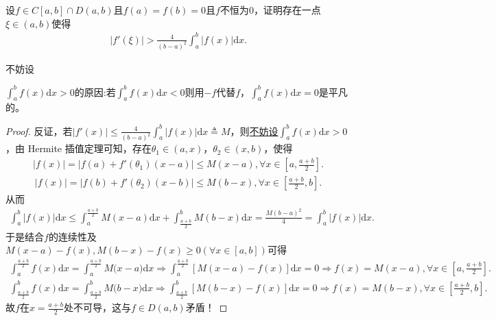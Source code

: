 \documentclass[../../main.tex]{subfiles}%
\begin{document}
\begin{example}
设\(f \in C[a,b]\cap D(a,b)\)且\(f(a) = f(b) = 0\)且\(f\)不恒为\(0\)，证明存在一点\(\xi \in (a,b)\)使得
\begin{align}
|f'(\xi)| > \frac{4}{(b - a)^2}\int_{a}^{b}\left|f(x)\right|\mathrm{d}x.\label{eq:::23523523424jrioj53313}
\end{align} 
\end{example}
\begin{remark}
\hypertarget{example0.5----:不妨设的原因}{不妨设}\(\int_{a}^{b}f(x)\mathrm{d}x > 0\)的原因:若\(\int_{a}^{b}f(x)\mathrm{d}x < 0\)则用\(-f\)代替\(f\)，\(\int_{a}^{b}f(x)\mathrm{d}x = 0\)是平凡的。
\end{remark}
\begin{proof}
反证，若\(|f'(x)| \leqslant \frac{4}{(b - a)^2}\int_{a}^{b}\left|f(x)\right| \mathrm{d}x\triangleq M\)，则\hyperlink{example0.5----:不妨设的原因}{不妨设\(\int_{a}^{b}f(x)\mathrm{d}x > 0\)}，由 Hermite 插值定理可知，存在\(\theta_1 \in (a, x)\)，\(\theta_2 \in (x, b)\)，使得
\begin{align*}
\left|f(x)\right| = \left|f(a) + f'(\theta_1)(x - a) \right|\leqslant M(x - a), \forall x \in \left[a, \frac{a + b}{2}\right].
\end{align*}
\begin{align*}
\left|f(x)\right| = \left|f(b) + f'(\theta_2)(x - b)\right| \leqslant M(b - x), \forall x \in \left[\frac{a + b}{2}, b\right].
\end{align*}
从而
\begin{align*}
\int_{a}^{b}|f(x)|\mathrm{d}x \leqslant \int_{a}^{\frac{a + b}{2}}M(x - a)\mathrm{d}x + \int_{\frac{a + b}{2}}^{b}M(b - x)\mathrm{d}x = \frac{M(b - a)^2}{4} = \int_{a}^{b}|f(x)|\mathrm{d}x.
\end{align*}
于是结合\(f\)的连续性及$M(x-a)-f(x),M(b-x)-f(x)\geqslant 0(\forall x\in [a,b])$可得
\begin{align*}
\int_a^{\frac{a+b}{2}}{f(x)\mathrm{d}x}=\int_a^{\frac{a+b}{2}}{M(x}-a)\mathrm{d}x\Longrightarrow \int_a^{\frac{a+b}{2}}{\left[ M\left( x-a \right) -f\left( x \right) \right] \mathrm{d}x}=0\Longrightarrow f(x)=M(x-a),\forall x\in \left[ a,\frac{a+b}{2} \right] .
\end{align*}
\begin{align*}
\int_{\frac{a+b}{2}}^b{f(x)\mathrm{d}x}=\int_{\frac{a+b}{2}}^b{M(b}-x)\mathrm{d}x\Longrightarrow \int_{\frac{a+b}{2}}^b{\left[ M\left( b-x \right) -f\left( x \right) \right] \mathrm{d}x}=0\Longrightarrow f(x)=M(b-x),\forall x\in \left[ \frac{a+b}{2},b \right] .
\end{align*}
故\(f\)在\(x = \frac{a + b}{2}\)处不可导，这与\(f \in D(a, b)\)矛盾！
\end{proof}
\end{document}
